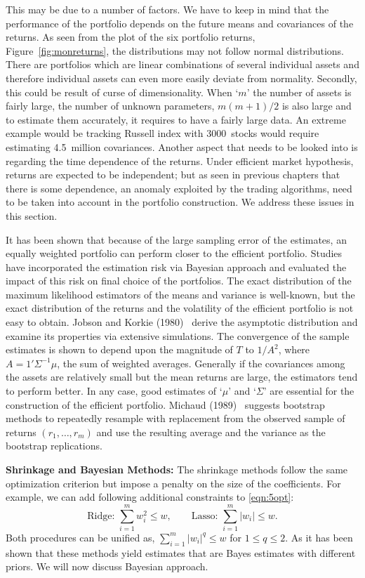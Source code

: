 This may be due to a number of factors. We have to keep in mind that the performance of the portfolio depends on the future means and covariances of the returns. As seen from the plot of the six portfolio returns, Figure~\ref{fig:monreturns}, the distributions may not follow normal distributions. There are portfolios which are linear combinations of several individual assets and therefore individual assets can even more easily deviate from normality. Secondly, this could be result of curse of dimensionality. When `$m$' the number of assets is fairly large, the number of unknown parameters, $m(m+1)/2$ is also large and to estimate them accurately, it requires to have a fairly large data. An extreme example would be tracking Russell index with 3000~stocks would require estimating 4.5~million covariances. Another aspect that needs to be looked into is regarding the time dependence of the returns. Under efficient market hypothesis, returns are expected to be independent; but as seen in previous chapters that there is some dependence, an anomaly exploited by the trading algorithms, need to be taken into account in the portfolio construction. We address these issues in this section. 


It has been shown that because of the large sampling error of the estimates, an equally weighted portfolio can perform closer to the efficient portfolio. Studies have incorporated the estimation risk via Bayesian approach and evaluated the impact of this risk on final choice of the portfolios. The exact distribution of the maximum likelihood estimators of the means and variance is well-known, but the exact distribution of the returns and the volatility of the efficient portfolio is not easy to obtain. Jobson and Korkie (1980)~\cite{jobkor} derive the asymptotic distribution and examine its properties via extensive simulations. The convergence of the sample estimates is shown to depend upon the magnitude of $T$ to $1/A^2$, where $A=1' \Sigma^{-1}\mu$, the sum of weighted averages. Generally if the covariances among the assets are relatively small but the mean returns are large, the estimators tend to perform better. In any case, good estimates of `$\mu$' and `$\Sigma$' are essential for the construction of the efficient portfolio. Michaud (1989)~\cite{michaud} suggests bootstrap methods to repeatedly resample with replacement from the observed sample of returns $(r_1, \ldots, r_m)$ and use the resulting average and the variance as the bootstrap replications. \twomedskip


\noindent\textbf{Shrinkage and Bayesian Methods:} The shrinkage methods follow the same optimization criterion but impose a penalty on the size of the coefficients. For example, we can add following additional constraints to \eqref{eqn:5opt}:
	\begin{equation} \label{eqn:addconstraint}
	\text{Ridge: } \sum_{i=1}^m w_i^2 \leq w, \qquad \text{Lasso: } \sum_{i=1}^m |w_i| \leq w.
	\end{equation}
Both procedures can be unified as, $\sum_{i=1}^m |w_i|^q \leq w$ for $1 \leq q \leq 2$. As it has been shown that these methods yield estimates that are Bayes estimates with different priors. We will now discuss Bayesian approach. 


